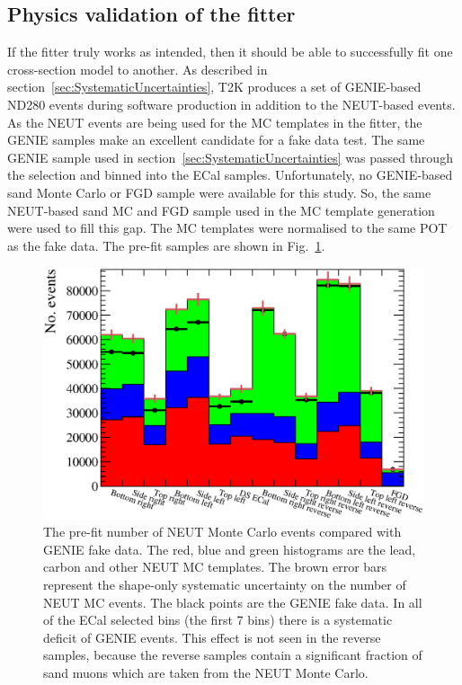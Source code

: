 \subsection{Physics validation of the fitter}
\label{subsec:PhysicsFitterValidation}
If the fitter truly works as intended, then it should be able to successfully fit one cross-section model to another.  As described in section~\ref{sec:SystematicUncertainties}, T2K produces a set of GENIE-based ND280 events during software production in addition to the NEUT-based events.  As the NEUT events are being used for the MC templates in the fitter, the GENIE samples make an excellent candidate for a fake data test.
\newline
\newline 
The same GENIE sample used in section~\ref{sec:SystematicUncertainties} was passed through the selection and binned into the ECal samples.  Unfortunately, no GENIE-based sand Monte Carlo or FGD sample were available for this study.  So, the same NEUT-based sand MC and FGD sample used in the MC template generation were used to fill this gap.  The MC templates were normalised to the same POT as the fake data.  The pre-fit samples are shown in Fig.~\ref{fig:MCTemplatesWithSystematicsGenieDataPreFit}.
\begin{figure}
  \centering
  \includegraphics[width=15cm]{images/measurement/validation/genie/MCTemplatesWithSystematics_GenieData_PreFit.eps}
  \caption{The pre-fit number of NEUT Monte Carlo events compared with GENIE fake data.  The red, blue and green histograms are the lead, carbon and other NEUT MC templates.  The brown error bars represent the shape-only systematic uncertainty on the number of NEUT MC events.  The black points are the GENIE fake data.  In all of the ECal selected bins (the first 7 bins) there is a systematic deficit of GENIE events.  This effect is not seen in the reverse samples, because the reverse samples contain a significant fraction of sand muons which are taken from the NEUT Monte Carlo.}
  \label{fig:MCTemplatesWithSystematicsGenieDataPreFit}
\end{figure}
